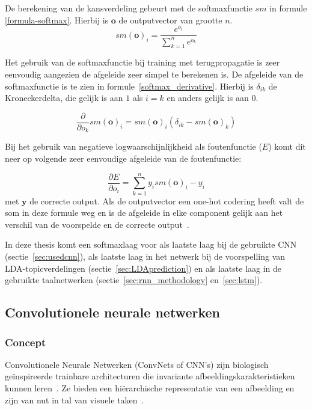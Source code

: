 De berekening van de kansverdeling gebeurt met de softmaxfunctie $sm$ in formule \eqref{formula-softmax}. Hierbij is $\mathbf{o}$ de outputvector van grootte $n$.
\begin{equation}
sm(\textbf{o})_i = \frac{e^{o_i}}{\sum^{n}_{k=1}{e^{o_k}}}
\label{formula-softmax}
\end{equation}

Het gebruik van de softmaxfunctie bij training met terugpropagatie is zeer eenvoudig aangezien de afgeleide zeer simpel te berekenen is. De afgeleide van de softmaxfunctie is te zien in formule~\eqref{softmax_derivative}. Hierbij is $\delta_{ik}$ de Kroneckerdelta, die gelijk is aan $1$ als $i = k$ en anders gelijk is aan $0$.

\begin{equation}
    \frac{\partial}{\partial o_k}sm(\textbf{o})_i =  sm(\textbf{o})_i(\delta_{ik} - sm(\textbf{o})_k)
    \label{softmax_derivative}
\end{equation}

Bij het gebruik van negatieve logwaarschijnlijkheid als foutenfunctie ($E$) komt dit neer op volgende zeer eenvoudige afgeleide van de foutenfunctie:

\begin{equation}
    \frac{\partial E}{\partial o_i} = \sum_{k=1}^n{y_i}sm(\textbf{o})_i - y_i
\end{equation}
met $\textbf{y}$ de correcte output. Als de outputvector een one-hot codering heeft valt de som in deze formule weg en is de afgeleide in elke component gelijk aan het verschil van de voorspelde en de correcte output~\cite{Bishop:1995:NNP:525960}. 

In deze thesis komt een softmaxlaag voor als laatste laag bij de gebruikte CNN \mbox{(sectie \ref{sec:usedcnn})}, als laatste laag in het netwerk bij de voorspelling van LDA-topicverde\-lingen (sectie~\ref{sec:LDAprediction}) en als laatste laag in de gebruikte taalnetwerken (sectie~\ref{sec:rnn_methodology} en~\ref{sec:lstm}).

\subsection{Convolutionele neurale netwerken}
\label{sec:CNN}
\subsubsection{Concept}
Convolutionele Neurale Netwerken (ConvNets of CNN's) zijn biologisch ge\" inspireerde trainbare architecturen die invariante afbeeldingskarakteristieken kunnen leren~\cite{LeCun2010}. Ze bieden een hi\"erarchische representatie van een afbeelding en zijn van nut in tal van visuele taken~\cite{Ciresan2012,Girshick2014,Zhou2015}.

